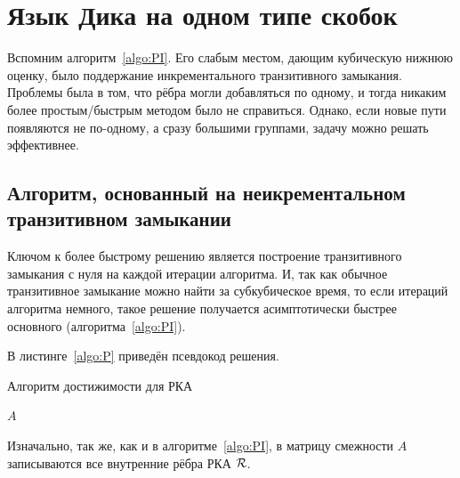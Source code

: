 \section{Язык Дика на одном типе скобок}\label{section:dyck_1}

Вспомним алгоритм~\ref{algo:PI}. Его слабым местом, дающим кубическую нижнюю оценку, было поддержание инкрементального транзитивного замыкания. Проблемы была в том, что рёбра могли добавляться по одному, и тогда никаким более простым/быстрым методом было не справиться. Однако, если новые пути появляются не по-одному, а сразу большими группами, задачу можно решать эффективнее.

\subsection{Алгоритм, основанный на неикрементальном транзитивном замыкании}\label{subsection:nitc}

Ключом к более быстрому решению является построение транзитивного замыкания с нуля на каждой итерации алгоритма. И, так как обычное транзитивное замыкание можно найти за субкубическое время, то если итераций алгоритма немного, такое решение получается асимптотически быстрее основного (алгоритма~\ref{algo:PI}).

В листинге~\ref{algo:P} приведён псевдокод решения.

\begin{algorithm}[h]
    \begin{algorithmic}[1]
    \caption{Алгоритм достижимости для РКА}
    \label{algo:P}
                        \EndIf
                    \EndFor
               \EndFor
            \EndFor
        \EndWhile
    \State \Return $A$
    \EndFunction
    \end{algorithmic}
\end{algorithm}

Изначально, так же, как и в алгоритме~\ref{algo:PI}, в матрицу смежности $A$ записываются все внутренние рёбра РКА $\mathcal{R}$.


